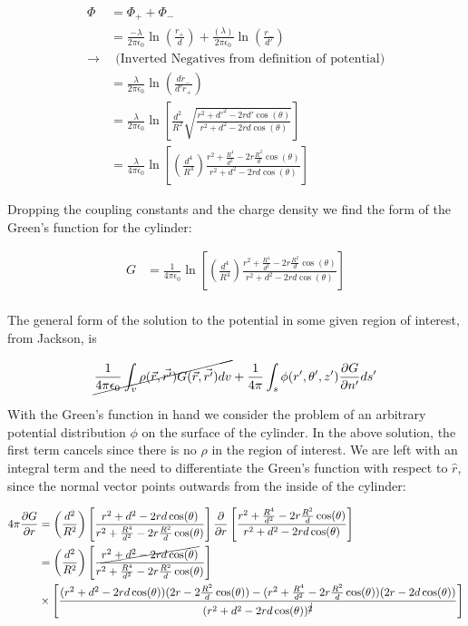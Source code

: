 \documentclass[paper=a4, fontsize=11pt]{scrartcl} %
\numberwithin{equation}{section} %
\numberwithin{figure}{section} %
\numberwithin{table}{section} %
\begin{document}
\begin{align}
\Phi &= \Phi_+ + \Phi_- \\
&= \frac{-\lambda}{2 \pi \epsilon_0}\ln\left(\frac{r_+}{d}\right) + \frac{(\lambda)}{2 \pi \epsilon_0}\ln\left(\frac{r_-}{d'}\right)  \\
\rightarrow &  \ \ \text{(Inverted Negatives from definition of potential)} \\
&= \frac{\lambda}{2 \pi \epsilon_0}\ln\left(\frac{dr_-}{d'r_+}\right) \\
&= \frac{\lambda}{2 \pi \epsilon_0}\ln\left[\frac{d^2}{R^2}\sqrt{\frac{r^2 + d'^2 - 2 r d' \cos(\theta)}{r^2 + d^2 - 2 r d \cos(\theta)}}\right] \\
&= \frac{\lambda}{4 \pi \epsilon_0}\ln\left[\left(\frac{d^4}{R^4}\right)\frac{r^2 + \frac{R^4}{d^2} - 2 r \frac{R^2}{d} \cos(\theta)}{r^2 + d^2 - 2 r d \cos(\theta)}\right]
\end{align}

Dropping the coupling constants and the charge density we find the form of the Green's function for the cylinder:

\begin{align}
G &= \frac{1}{4 \pi \epsilon_0} \ln\left[\left(\frac{d^4}{R^4}\right)\frac{r^2 + \frac{R^4}{d^2} - 2 r \frac{R^2}{d}\cos(\theta)}{r^2 + d^2 - 2 r d \cos(\theta)}\right] \\
\end{align}

The general form of the solution to the potential in some given region of interest, from Jackson, is

\begin{align}
\cancel{\frac{1}{4 \pi \epsilon_0}\int_v \rho(\vec{r},\vec{r'})G(\vec{r},\vec{r'})dv} + \frac{1}{4 \pi}\int_s \phi(r',\theta',z') \frac{\partial G}{\partial n'}ds'
\end{align}

With the Green's function in hand we consider the problem of an arbitrary potential distribution $\phi$ on the surface of the cylinder. In the above solution, the first term cancels since there is no $\rho$ in the region of interest. We are left with an integral term and the need to differentiate the Green's function with respect to $\hat{r}$, since the normal vector points outwards from the inside of the cylinder:

\begin{align}
4\pi\frac{\partial G}{\partial r} &= \left(\frac{d^2}{R^2}\right)\left[\frac{r^2 + d^2 - 2 r d \cos(\theta)}{r^2 + \frac{R^4}{d^2} - 2 r \frac{R^2}{d}\cos(\theta)}\right]\frac{\partial}{\partial r} \left[\frac{r^2 + \frac{R^4}{d^2} - 2 r \frac{R^2}{d}\cos(\theta)}{r^2 + d^2 - 2 r d \cos(\theta)}\right] \\
&= \left(\frac{d^2}{R^2}\right)  \left[\frac{\cancel{r^2 + d^2 - 2 r d \cos(\theta)}}{r^2 + \frac{R^4}{d^2} - 2 r \frac{R^2}{d}\cos(\theta)}\right]  \\ &  \times  \left[\frac{(r^2 + d^2 - 2 r d \cos(\theta))(2r - 2 \frac{R^2}{d}\cos(\theta)) - (r^2 + \frac{R^4}{d^2} - 2 r \frac{R^2}{d}\cos(\theta))(2r - 2d \cos(\theta))}{(r^2 + d^2 - 2 r d \cos(\theta))^{\cancel{2}}}\right]
\end{align}
\end{document}
